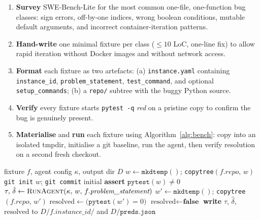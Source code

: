 \documentclass[11pt]{article}
\begin{document}
\begin{enumerate}[leftmargin=*,label=\textbf{Step~\arabic*.}]
  \item \textbf{Survey} SWE-Bench-Lite for the most common one-file,
        one-function bug classes: sign errors, off-by-one indices, wrong
        boolean conditions, mutable default arguments, and incorrect
        container-iteration patterns.
  \item \textbf{Hand-write} one minimal fixture per class ($\leq 10$ LoC,
        one-line fix) to allow rapid iteration without Docker images and
        without network access.
  \item \textbf{Format} each fixture as two artefacts: (a)
        \texttt{instance.yaml} containing \texttt{instance\_id},
        \texttt{problem\_statement}, \texttt{test\_command}, and optional
        \texttt{setup\_commands}; (b) a \texttt{repo/} subtree with the
        buggy Python source.
  \item \textbf{Verify} every fixture starts \texttt{pytest -q} \emph{red}
        on a pristine copy to confirm the bug is genuinely present.
  \item \textbf{Materialise} and \textbf{run} each fixture using
        Algorithm~\ref{alg:bench}: copy into an isolated tmpdir, initialise a
        git baseline, run the agent, then verify resolution on a second fresh
        checkout.
\end{enumerate}

\begin{algorithm}[ht]
\caption{Fixture materialisation and resolution check
         (\texttt{minibench/runner.py::run\_instance})}
\label{alg:bench}
\begin{algorithmic}[1]
\Require fixture $f$, agent config $\kappa$, output dir $D$
\State $w \gets \texttt{mkdtemp}()$;
       \texttt{copytree}$(f.\textit{repo},\, w)$
\State \texttt{git init} $w$;
       \texttt{git commit} \textquotedbl{}initial\textquotedbl{}
\State \textbf{assert} $\texttt{pytest}(w) \neq 0$
\State $\tau,\,\hat{\delta} \gets \textsc{RunAgent}(\kappa,\, w,\,
       f.\textit{problem\_statement})$
\State $w' \gets \texttt{mkdtemp}()$;
       \texttt{copytree}$(f.\textit{repo},\, w')$
  \State $\text{resolved} \gets
         \bigl(\texttt{pytest}(w') = 0\bigr)$
\Else
  \State $\text{resolved} \gets \textbf{false}$
\EndIf
\State \textbf{write} $\tau$, $\hat{\delta}$, $\text{resolved}$
       to $D/f.\textit{instance\_id}/$ and $D/\texttt{preds.json}$
\end{algorithmic}
\end{algorithm}
\end{document}
